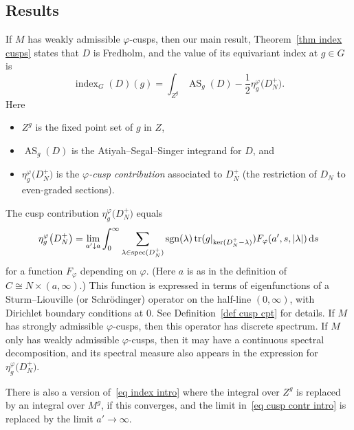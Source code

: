 \documentclass[pdftex]{sigma}%
\numberwithin{equation}{section}
\DeclareMathOperator{\tr}{tr}
\DeclareMathOperator{\spec}{spec}
\DeclareMathOperator{\AS}{AS}
\DeclareMathOperator{\ind}{index}
\DeclareMathOperator{\sgn}{sgn}
\begin{document}
\subsection*{Results}

If $M$ has weakly admissible $\varphi$-cusps, then our main result, Theorem~\ref{thm index cusps} states that $D$ is Fredholm, and the value of its equivariant index at $g \in G$ is
\begin{equation} \label{eq index intro}
\ind_G(D)(g) = \int_{Z^g} \AS_g(D) - \frac{1}{2}\eta_g^{\varphi}\big(D_N^+\big).
\end{equation}
Here
\begin{itemize}\itemsep=0pt
\item $Z^g$ is the fixed point set of $g$ in $Z$,
\item $\AS_g(D)$ is the Atiyah--Segal--Singer integrand for $D$, and
\item $\eta_g^{\varphi}\big(D_N^+\big)$ is the \emph{$\varphi$-cusp contribution} associated to $D_N^+$ (the restriction of $D_N$ to even-graded sections).
\end{itemize}
The cusp contribution $\eta_g^{\varphi}\big(D_N^+\big)$ equals
\begin{equation} \label{eq cusp contr intro}
\eta^{\varphi}_g\big(D_N^+\big) =
\lim_{a'\downarrow a}
 \int_{0}^{\infty}
\sum_{\lambda \in \spec(D_N^+)}\sgn(\lambda) \tr(g|_{\ker(D_N^+ - \lambda)})
F_{\varphi}(a', s, |\lambda|) \, {\rm d}s
\end{equation}
for a function $F_{\varphi}$ depending on $\varphi$. (Here $a$ is as in the definition of $C \cong N \times (a, \infty)$.) This function is expressed
 in terms of eigenfunctions of a Sturm--Liouville (or Schr\"odinger) operator on the half-line $(0, \infty)$, with Dirichlet boundary conditions at $0$. See Definition~\ref{def cusp cpt} for details. If $M$ has strongly admissible $\varphi$-cusps, then this operator has discrete spectrum. If $M$ only has weakly admissible $\varphi$-cusps, then it may have a continuous spectral decomposition, and its spectral measure also appears in the expression for $\eta_g^{\varphi}\big(D_N^+\big)$.

There is also a version of~\eqref{eq index intro} where the integral over $Z^g$ is replaced by an integral over $M^g$, if this converges, and the limit in~\eqref{eq cusp contr intro} is replaced by the limit $a' \to \infty$.
\end{document}
